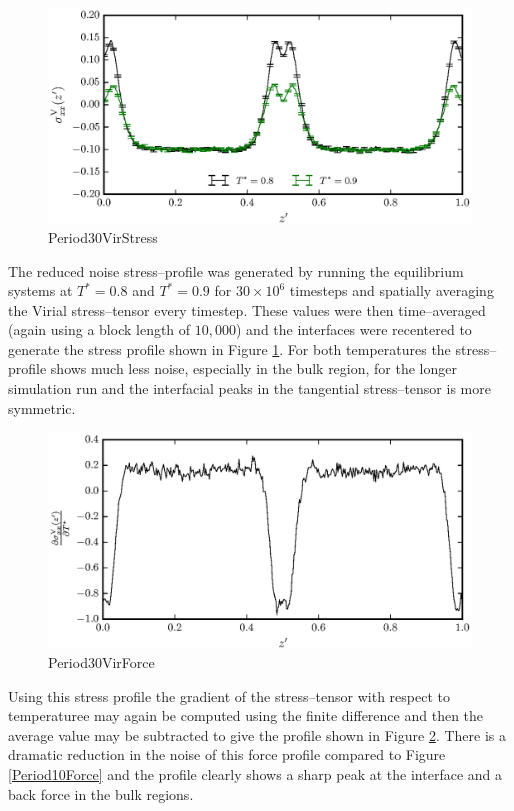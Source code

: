 \begin{figure}[h]
\centering
\includegraphics[scale=0.8]{Period30VirStress}
\caption{Period30VirStress}
\label{Period30VirStress}
\end{figure}

The reduced noise stress--profile was generated by running the equilibrium systems at $T^{*}=0.8$ and $T^{*}=0.9$ for $30 \times 10^{6}$ timesteps and spatially averaging the Virial stress--tensor every timestep.
These values were then time--averaged (again using a block length of $10,000$) and the interfaces were recentered to generate the stress profile shown in Figure \ref{Period30VirStress}.
For both temperatures the stress--profile shows much less noise, especially in the bulk region, for the longer simulation run and the interfacial peaks in the tangential stress--tensor is more symmetric.
\FloatBarrier

\begin{figure}[h]
\centering
\includegraphics[scale=0.8]{Period30VirForce}
\caption{Period30VirForce}
\label{Period30VirForce}
\end{figure}
Using this stress profile the gradient of the stress--tensor with respect to temperaturee may again be computed using the finite difference and then the average value may be subtracted to give the profile shown in Figure \ref{Period30VirForce}.
There is a dramatic reduction in the noise of this force profile compared to Figure \ref{Period10Force} and the profile clearly shows a sharp peak at the interface and a back force in the bulk regions.
\FloatBarrier

